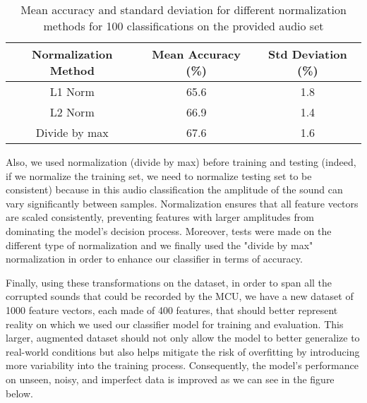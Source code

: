 \documentclass{article}
\begin{document}
\begin{table}[h!]
    \centering
    \begin{tabular}{ccc}
        \toprule
        \textbf{Normalization Method} & \textbf{Mean Accuracy (\%)} & \textbf{Std Deviation (\%)} \\
        \midrule
        L1 Norm         & 65.6 & 1.8 \\
        L2 Norm         & 66.9 & 1.4 \\
        Divide by max   & 67.6 & 1.6 \\
        \bottomrule
    \end{tabular}
    \caption{Mean accuracy and standard deviation for different normalization methods for 100 classifications on the provided audio set}
    \label{tab:normalization_comparison}
\end{table}

Also, we used normalization (divide by max) before training and testing (indeed, if we normalize the training set, we need to normalize testing set to be consistent) because in this audio classification the amplitude of the sound can vary significantly between samples. Normalization ensures that all feature vectors are scaled consistently, preventing features with larger amplitudes from dominating the model's decision process. Moreover, tests were made on the different type of normalization and we finally used the "divide by max" normalization in order to enhance our classifier in terms of accuracy.




Finally, using these transformations on the dataset, in order to span all the corrupted sounds that could be recorded by the MCU, we have a new dataset of 1000 feature vectors, each made of 400 features, that should better represent reality on which we used our classifier model for training and evaluation. This larger, augmented dataset should not only allow the model to better generalize to real-world conditions but also helps mitigate the risk of overfitting by introducing more variability into the training process. Consequently, the model's performance on unseen, noisy, and imperfect data is improved as we can see in the figure below.
\end{document}
